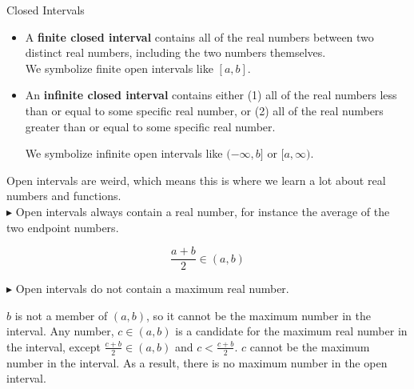\documentclass{ximera}
\begin{document}
\begin{definition}  Closed Intervals



\begin{itemize}
\item A \textbf{finite closed interval} contains all of the real numbers between two distinct real numbers, including the two numbers themselves.\\

We symbolize finite open intervals like $[a, b]$. \\




\item An \textbf{infinite closed interval} contains either (1) all of the real numbers less than or equal to some specific real number, or (2) all of the real numbers greater than or equal to some specific real number.

We symbolize infinite open intervals like $(-\infty, b]$ or $[a, \infty)$.
\end{itemize}


\end{definition}










Open intervals are weird, which means this is where we learn a lot about real numbers and functions. \\


$\blacktriangleright$  Open intervals always contain a real number, for instance the average of the two endpoint numbers.



\[  \frac{a+b}{2}  \in (a,b)    \]





$\blacktriangleright$ Open intervals do not contain a maximum real number.

$b$ is not a member of $(a,b)$, so it cannot be the maximum number in the interval.   Any number, $c \in (a,b)$ is a candidate for the maximum real number in the interval, except  $\frac{c+b}{2} \in (a,b)$  and $c < \frac{c+b}{2}$.  $c$ cannot be the maximum number in the interval.  As a result, there is no maximum number in the open interval. \\
\end{document}
